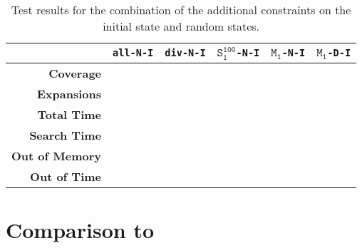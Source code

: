 \begin{table}[h!]
    \begin{center}
        \begin{tabular}{|r|c|c|c|c|c|}
            \hline
            & \textbf{\texttt{all-N-I}} & \textbf{\texttt{div-N-I}} & \textbf{$\texttt{S}_\texttt{1}^\texttt{100}$\texttt{-N-I}} & \textbf{$\texttt{M}_\texttt{1}$\texttt{-N-I}} & \textbf{$\texttt{M}_\texttt{1}$\texttt{-D-I}} \\
            \hline \hline
            \textbf{Coverage} &  &  &  &  &  \\ \hline
            \textbf{Expansions} &  &  &  &  &  \\ \hline
            \textbf{Total Time} &  &  &  &  &  \\ \hline
            \textbf{Search Time} &  &  &  &  &  \\ \hline
            \textbf{Out of Memory} &  &  &  &  &  \\ \hline
            \textbf{Out of Time} &  &  &  &  &  \\ \hline
        \end{tabular}
        \caption{Test results for the combination of the additional constraints on the initial state and random states.}
        \label{table:initial-and-random-constraint}
    \end{center}
\end{table}

\section{Comparison to~\citeauthor{fivser2020strengthening}}\label{sec:comparison-to-fiser}
